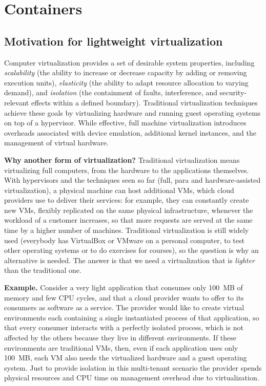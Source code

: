 \chapter{Containers}

\section{Motivation for lightweight virtualization}

Computer virtualization provides a set of desirable system properties, including \emph{scalability} (the ability to increase or decrease capacity by adding or removing execution units), \emph{elasticity} (the ability to adapt resource allocation to varying demand), and \emph{isolation} (the containment of faults, interference, and security-relevant effects within a defined boundary). Traditional virtualization techniques achieve these goals by virtualizing hardware and running guest operating systems on top of a hypervisor. While effective, full machine virtualization introduces overheads associated with device emulation, additional kernel instances, and the management of virtual hardware.

\begin{notebox}
	\textbf{Why another form of virtualization?} Traditional virtualization means virtualizing full computers, from the hardware to the applications themselves. With hypervisors and the techniques seen so far (full, para and hardware-assisted virtualization), a physical machine can host additional VMs, which cloud providers use to deliver their services: for example, they can constantly create new VMs, flexibly replicated on the same physical infrastructure, whenever the workload of a customer increases, so that more requests are served at the same time by a higher number of machines. Traditional virtualization is still widely used (everybody has VirtualBox or VMware on a personal computer, to test other operating systems or to do exercises for courses), so the question is why an alternative is needed. The answer is that we need a virtualization that is \emph{lighter} than the traditional one.

\medskip
\textbf{Example.} Consider a very light application that consumes only 100~MB of memory and few CPU cycles, and that a cloud provider wants to offer to its consumers as software as a service. The provider would like to create virtual environments each containing a single instantiated process of that application, so that every consumer interacts with a perfectly isolated process, which is not affected by the others because they live in different environments. If these environments are traditional VMs, then, even if each application uses only 100~MB, each VM also needs the virtualized hardware and a guest operating system. Just to provide isolation in this multi-tenant scenario the provider spends physical resources and CPU time on management overhead due to virtualization.
\end{notebox}

